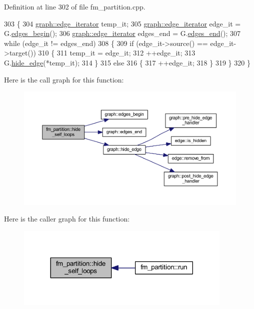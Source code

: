 Definition at line 302 of file fm\+\_\+partition.\+cpp.


\begin{DoxyCode}
303 \{
304     \mbox{\hyperlink{classgraph_a818d3766018eb0af91d520ce2150203c}{graph::edge\_iterator}} temp\_it;
305     \mbox{\hyperlink{classgraph_a818d3766018eb0af91d520ce2150203c}{graph::edge\_iterator}} edge\_it = G.\mbox{\hyperlink{classgraph_a7ba35a4c4e8343ffb27ed6d9703c6f18}{edges\_begin}}();
306     \mbox{\hyperlink{classgraph_a818d3766018eb0af91d520ce2150203c}{graph::edge\_iterator}} edges\_end = G.\mbox{\hyperlink{classgraph_aea8d7f976b85b6137f52d915e26639f6}{edges\_end}}();
307     \textcolor{keywordflow}{while} (edge\_it != edges\_end)
308     \{
309     \textcolor{keywordflow}{if} (edge\_it->source() == edge\_it->target())
310     \{
311         temp\_it = edge\_it;
312         ++edge\_it;
313         G.\mbox{\hyperlink{classgraph_ab2f8520bcac080d73c55228fecc61825}{hide\_edge}}(*temp\_it);
314     \}
315     \textcolor{keywordflow}{else}
316     \{
317         ++edge\_it;
318     \}
319     \}
320 \}
\end{DoxyCode}
Here is the call graph for this function\+:\nopagebreak
\begin{figure}[H]
\begin{center}
\leavevmode
\includegraphics[width=350pt]{classfm__partition_a3e3aa22119ff5ff9c406683e22ab6078_cgraph}
\end{center}
\end{figure}
Here is the caller graph for this function\+:\nopagebreak
\begin{figure}[H]
\begin{center}
\leavevmode
\includegraphics[width=293pt]{classfm__partition_a3e3aa22119ff5ff9c406683e22ab6078_icgraph}
\end{center}
\end{figure}
\mbox{\label{classfm__partition_a9aa27d4c97616c0fdbd00d11dc83bc0b}} 
